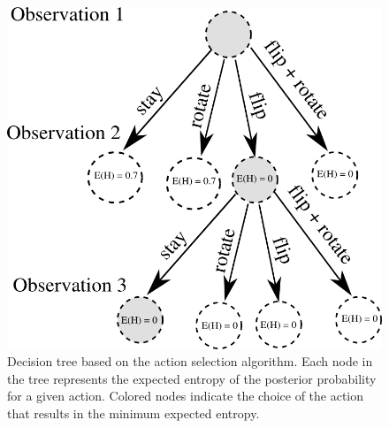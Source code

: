  
        

    \begin{figure}
    \centering
    		\includegraphics[width = 0.7\columnwidth]{pics/tree_small.png}
    	\caption{Decision tree based on the action selection algorithm. Each node in the tree represents the expected entropy of the posterior probability for a given action. Colored nodes indicate the choice of the action that results in the minimum expected entropy.}
    	    	\label{fig:tree}
    \end{figure}
    
